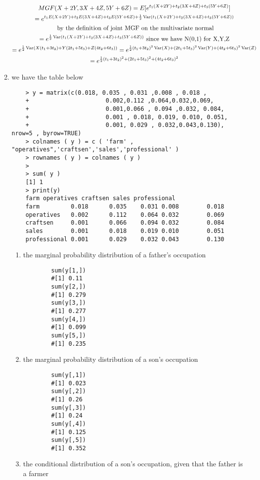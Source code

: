 \documentclass[11pt]{article}
\newcommand{\Var}{\mathop{\rm Var}}
\begin{document}
\begin{enumerate}
\begin{gather}
	MGF(X + 2Y, 3X + 4Z, 5Y + 6Z) = E[e^{t_1(X + 2Y) + t_2(3X + 4Z) + t_3(5Y+6Z)}] \\
	= e^{t_1E(X + 2Y) + t_2E(3X + 4Z) + t_3E(5Y+6Z) + \frac{1}{2} \Var(t_1(X + 2Y) + t_2(3X + 4Z) + t_3(5Y+6Z))} \\
	\text{ by the definition of joint MGF on the multivariate normal}\\
	= e^{\frac{1}{2} \Var(t_1(X + 2Y) + t_2(3X + 4Z) + t_3(5Y+6Z))} \text{ since we have N(0,1) for X,Y,Z}\\
	=e^{\frac{1}{2} \Var(X(t_1+3t_2) + Y(2t_1+5t_3) + Z(4t_2+6t_3))}
	=e^{\frac{1}{2} (t_1+3t_2)^2\Var(X)+(2t_1+5t_3)^2\Var(Y) + (4t_2+6t_3)^2\Var(Z)}\\
	=e^{\frac{1}{2} (t_1+3t_2)^2+(2t_1+5t_3)^2 + (4t_2+6t_3)^2}
\end{gather}
\item we have the table below
\begin{verbatim}
	> y = matrix(c(0.018, 0.035 , 0.031 ,0.008 , 0.018 ,
	+                      0.002,0.112 ,0.064,0.032,0.069,
	+                      0.001,0.066 , 0.094 ,0.032, 0.084,
	+                      0.001 , 0.018, 0.019, 0.010, 0.051,
	+                      0.001, 0.029 , 0.032,0.043,0.130), nrow=5 , byrow=TRUE)
	> colnames ( y ) = c ( 'farm' , "operatives",'craftsen','sales','professional' )
	> rownames ( y ) = colnames ( y )
	> 
	> sum( y )
	[1] 1
	> print(y)
	farm operatives craftsen sales professional
	farm         0.018      0.035    0.031 0.008        0.018
	operatives   0.002      0.112    0.064 0.032        0.069
	craftsen     0.001      0.066    0.094 0.032        0.084
	sales        0.001      0.018    0.019 0.010        0.051
	professional 0.001      0.029    0.032 0.043        0.130
\end{verbatim}
\begin{enumerate}
	\item the marginal probability distribution of a father’s occupation
	\begin{verbatim}
		sum(y[1,])
		#[1] 0.11
		sum(y[2,])
		#[1] 0.279
		sum(y[3,])
		#[1] 0.277
		sum(y[4,])
		#[1] 0.099
		sum(y[5,])
		#[1] 0.235
	\end{verbatim}
	\item the marginal probability distribution of a son’s occupation
	\begin{verbatim}
		sum(y[,1])
		#[1] 0.023
		sum(y[,2])
		#[1] 0.26
		sum(y[,3])
		#[1] 0.24
		sum(y[,4])
		#[1] 0.125
		sum(y[,5])
		#[1] 0.352
	\end{verbatim}
	\item the conditional distribution of a son’s occupation, given that the father is a farmer

\end{enumerate}
\end{enumerate}
\end{document}
